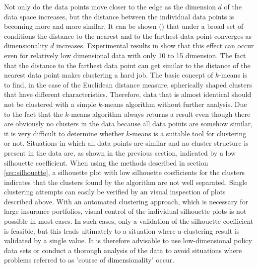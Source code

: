 Not only do the data points move closer to the edge as the dimension $d$ of the data space increases, but the distance between the individual data points is becoming more and more similar. It can be shown (\cite{beyer1999nearest}) that under a broad set of conditions the distance to the nearest and to the farthest data point converges as dimensionality $d$ increases. Experimental results in \cite{beyer1999nearest} show that this effect can occur even for relatively low dimensional data with only 10 to 15 dimension. The fact that the distance to the farthest data point can get similar to the distance of the nearest data point makes clustering a hard job. The basic concept of $k$-means is to find, in the case of the Euclidean distance measure, spherically shaped clusters that have different characteristics. Therefore, data that is almost identical should not be clustered with a simple $k$-means algorithm without further analysis. Due to the fact that the $k$-means algorithm always returns a result even though there are obviously no clusters in the data because all data points are somehow similar, it is very difficult to determine whether $k$-means is a suitable tool for clustering or not. Situations in which all data points are similar and no cluster structure is present in the data are, as shown in the previous section, indicated by a low silhouette coefficient. When using the methods described in section \ref{sec:silhouette}, a silhouette plot with low silhouette coefficients for the clusters indicates that the clusters found by the algorithm are not well separated. Single clustering attempts can easily be verified by an visual inspection of plots described above. With an automated clustering approach, which is necessary for large insurance portfolios, visual control of the individual silhouette plots is not possible in most cases. In such cases, only a validation of the silhouette coefficient is feasible, but this leads ultimately to a situation where a clustering result is validated by a single value.
It is therefore advisable to use low-dimensional policy data sets or conduct a thorough analysis of the data to avoid situations where problems referred to as 'course of  dimensionality' occur. 







